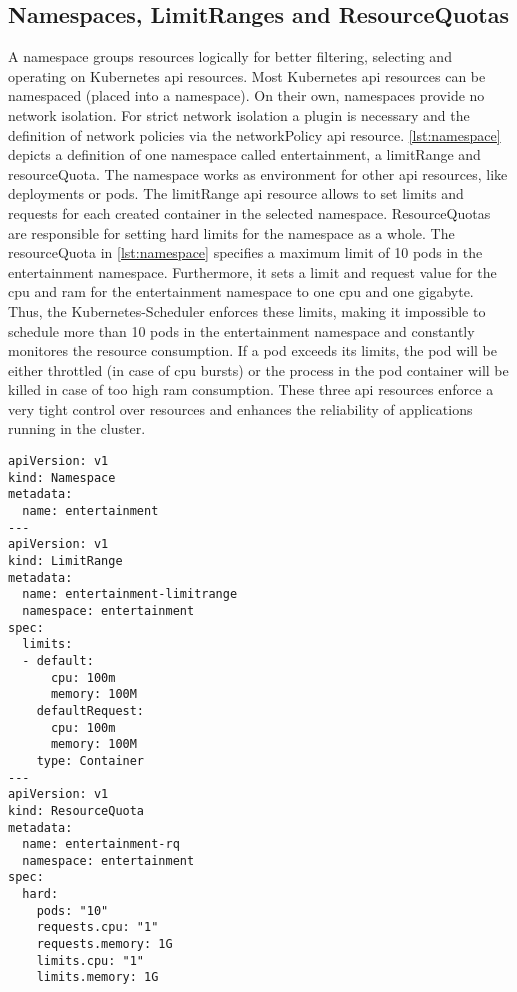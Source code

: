 \documentclass[titlepage]{report}
\begin{document}
\subsection{Namespaces, LimitRanges and ResourceQuotas}
A namespace groups resources logically for better filtering, selecting and operating on Kubernetes \gls{api} resources.
Most Kubernetes \gls{api} resources can be namespaced (placed into a namespace). On their own, namespaces provide no network isolation.
For strict network isolation a  plugin is necessary and the definition of network policies via the networkPolicy \gls{api}
resource. \autoref{lst:namespace} depicts a definition of one namespace called entertainment, a limitRange and resourceQuota.
The namespace works as environment for other \gls{api} resources, like deployments or pods. The limitRange \gls{api} resource
allows to set limits and requests for each created container in the selected namespace. ResourceQuotas are responsible for
setting hard limits for the namespace as a whole. The resourceQuota in \autoref{lst:namespace} specifies a maximum limit
of 10 pods in the entertainment namespace. Furthermore, it sets a limit and request value for the \gls{cpu} and \gls{ram} for
the entertainment namespace to one \gls{cpu} and one gigabyte. Thus, the Kubernetes-Scheduler enforces these limits, making it impossible
to schedule more than 10 pods in the entertainment namespace and constantly monitores the resource consumption. If a pod exceeds its
limits, the pod will be either throttled (in case of \gls{cpu} bursts) or the process in the pod container will be killed {in case of too high \gls{ram} consumption}.
These three \gls{api} resources enforce a very tight control over resources and enhances the reliability of applications running in the cluster.

\begin{minipage}{\linewidth}
\begin{lstlisting}[caption={Namespace definition for a namespace called entertainment with limitRange and ResourceQuota},label={lst:namespace}]
apiVersion: v1
kind: Namespace
metadata:
  name: entertainment
---
apiVersion: v1
kind: LimitRange
metadata:
  name: entertainment-limitrange
  namespace: entertainment
spec:
  limits:
  - default:
      cpu: 100m
      memory: 100M
    defaultRequest:
      cpu: 100m
      memory: 100M
    type: Container
---
apiVersion: v1
kind: ResourceQuota
metadata:
  name: entertainment-rq
  namespace: entertainment
spec:
  hard:
    pods: "10"
    requests.cpu: "1"
    requests.memory: 1G
    limits.cpu: "1"
    limits.memory: 1G
\end{lstlisting}
\end{minipage}
\end{document}
